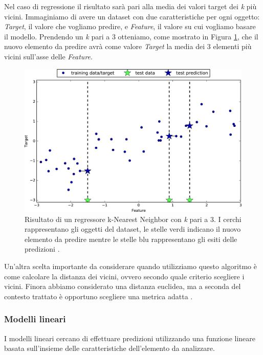\documentclass[a4paper,12pt]{report}
\begin{document}
Nel caso di regressione il risultato sarà pari alla media dei valori target dei \textit{k} più vicini. Immaginiamo di avere un dataset con due caratteristiche per ogni oggetto: \textit{Target}, il valore che vogliamo predire, e \textit{Feature}, il valore su cui vogliamo basare il modello. Prendendo un \textit{k} pari a 3 otteniamo, come mostrato in Figura \ref{fig:knearest_regression}, che il nuovo elemento da predire avrà come valore \textit{Target} la media dei 3 elementi più vicini sull'asse delle \textit{Feature}.

\begin{figure}[h]
    \centering
    \includegraphics[scale = 0.19]{images/knearese_regression_3k.png}
    \caption{Risultato di un regressore k-Nearest Neighbor con \textit{k} pari a 3. I cerchi rappresentano gli oggetti del dataset, le stelle verdi indicano il nuovo elemento da predire mentre le stelle blu rappresentano gli esiti delle predizioni \cite{figure_copyright}.}
    \label{fig:knearest_regression}
\end{figure}

Un'altra scelta importante da considerare quando utilizziamo questo algoritmo è come calcolare la distanza dei vicini, ovvero secondo quale criterio scegliere i vicini. Finora abbiamo considerato una distanza euclidea, ma a seconda del contesto trattato è opportuno scegliere una metrica adatta \cite{distance_metrics_knn}. 

\subsubsection{Modelli lineari}
I modelli lineari cercano di effettuare predizioni utilizzando una funzione lineare basata sull'insieme delle caratteristiche dell'elemento da analizzare.
\end{document}
